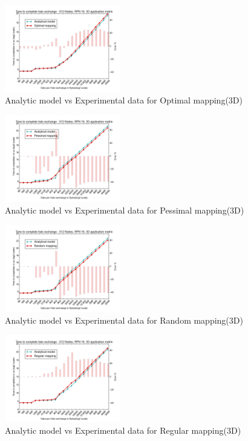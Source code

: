 \documentclass{acm_proc_article-sp}
\begin{document}
\begin{figure}
  \center
  \includegraphics[width=0.45\textwidth]{mappings/3d_optimal.png}
  \caption{Analytic model vs Experimental data for Optimal mapping(3D)}
    \label{fig:3D_optimal_mapping}
\end{figure}

\begin{figure}
  \center
  \includegraphics[width=0.45\textwidth]{mappings/3d_pessimal.png}
  \caption{Analytic model vs Experimental data for Pessimal mapping(3D)}
    \label{fig:3D_pessimal_mapping}
\end{figure}

\begin{figure}
  \center
  \includegraphics[width=0.45\textwidth]{mappings/3d_random.png}
  \caption{Analytic model vs Experimental data for Random mapping(3D)}
    \label{fig:3D_random_mapping}
\end{figure}

\begin{figure}
  \center
  \includegraphics[width=0.45\textwidth]{mappings/3d_regular.png}
  \caption{Analytic model vs Experimental data for Regular mapping(3D)}
    \label{fig:3D_regular_mapping}
\end{figure}
\end{document}
